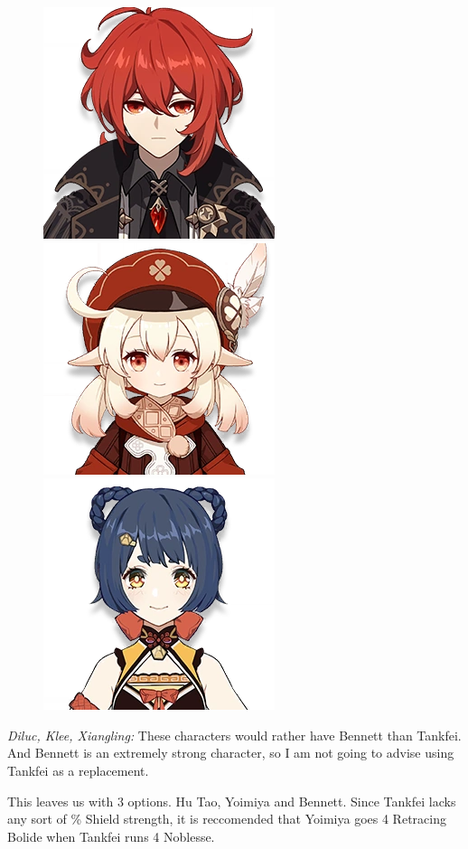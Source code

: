 \documentclass[11pt]{article}
\begin{document}
\begin{figure}[h]
    \centering
    \includegraphics[scale = 0.25]{Character_Diluc.png}
    \includegraphics[scale = 0.25]{Character_Klee.png}
    \includegraphics[scale = 0.25]{Character_Xiangling.png}
\end{figure}

\textit{Diluc, Klee, Xiangling:} These characters would rather have Bennett than Tankfei. And Bennett is an extremely strong character, so I am not going to advise using Tankfei as a replacement.

This leaves us with 3 options. Hu Tao, Yoimiya and Bennett. Since Tankfei lacks any sort of \% Shield strength, it is reccomended that Yoimiya goes 4 Retracing Bolide when Tankfei runs 4 Noblesse. 
\end{document}
